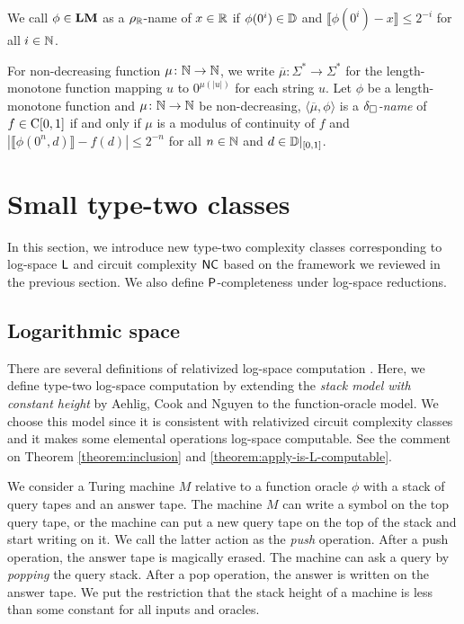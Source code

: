 \documentclass{article}
\theoremstyle{definition}
\theoremstyle{remark}
\begin{document}
We call $\phi \in \mathbf{LM}$ as a $\rho _\mathbb R$-name of $x \in \mathbb R$ 
if $\phi(0^i) \in \mathbb D$ and $\llbracket \phi(0^i) - x \rrbracket \le 2^{-i}$
for all $i \in \mathbb N$.

For non-decreasing function $\mu \colon \mathbb N \to \mathbb N$, 
we write $\overline \mu \colon \Sigma^* \to \Sigma^*$ for the length-monotone
function mapping $u$ to $0^{\mu(|u|)}$ for each string $u$.
Let $\phi$ be a length-monotone function and $\mu \colon \mathbb N \to \mathbb N$ be non-decreasing,
$\langle \overline{\mu}, \phi \rangle$ is a {\em $\delta _\square$-name} of $f \in \mathrm C[0,1]$
if and only if $\mu$ is a modulus of continuity of $f$
and $|\llbracket \phi(0^n, d) \rrbracket - f(d)| \le 2^{-n}$ for all $n \in \mathbb N$ and $d \in \mathbb D|_{[0,1]}$.


\section{Small type-two classes}
\label{section:small-classes}

In this section, we introduce new type-two complexity classes
corresponding to log-space $\mathsf{L}$ and circuit complexity $\mathsf{NC}$
based on the framework we reviewed in the previous section.
We also define $\mathsf{P}$-completeness under log-space reductions.

\subsection{Logarithmic space}
There are several definitions of relativized log-space computation
\cite{aehlig2007relativizing,buss1988relativized,ladner1976relativization,wilson1988measure, ota2013logspace}.
Here, we define type-two log-space computation 
by extending the {\em stack model with constant height} 
by Aehlig, Cook and Nguyen \cite{aehlig2007relativizing} to the 
function-oracle model.
We choose this model since it is consistent with relativized circuit complexity classes 
and it makes some elemental operations log-space computable.
See the comment on Theorem \ref{theorem:inclusion} and \ref{theorem:apply-is-L-computable}.


We consider a Turing machine $M$ relative to a function oracle $\phi$
with a stack of query tapes and an answer tape.
The machine $M$ can write a symbol on the top query tape, or the machine can
put a new query tape on the top of the stack and start writing on it.
We call the latter action as the {\em push} operation.
After a push operation, the answer tape is magically erased.
The machine can ask a query by {\em popping} the query stack.
After a pop operation, the answer is written on the answer tape.
We put the restriction that the stack height of a machine is less than 
some constant for all inputs and oracles.
\end{document}
